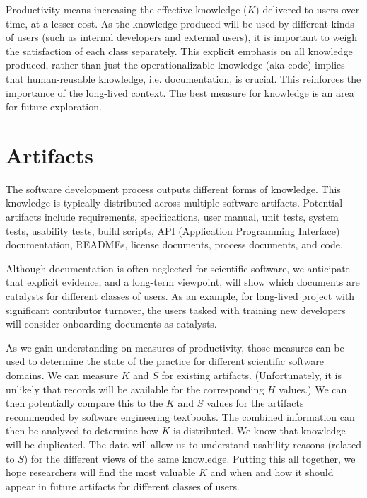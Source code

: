 \documentclass[sigconf, authorversion, nonacm]{acmart}
\begin{document}
Productivity means increasing the effective knowledge ($K$) delivered to users
over time, at a lesser cost. As the knowledge produced will be used by different
kinds of users (such as internal developers and external users), it is important
to weigh the satisfaction of each class separately. This explicit emphasis on
all knowledge produced, rather than just the operationalizable knowledge (aka
code) implies that human-reusable knowledge, i.e. documentation, is crucial.
This reinforces the importance of the long-lived context.  The best measure for
knowledge is an area for future exploration.






\section{Artifacts}

The software development process outputs different forms of knowledge. This
knowledge is typically distributed across multiple software artifacts.
Potential artifacts include requirements, specifications, user manual, unit
tests, system tests, usability tests, build scripts, API (Application
Programming Interface) documentation, READMEs, license documents, process
documents, and code.

Although documentation is often neglected for scientific software, we anticipate
that explicit evidence, and a long-term viewpoint, will show which documents are
catalysts for different classes of users.  As an example, for long-lived project
with significant contributor turnover, the users tasked with training new
developers will consider onboarding documents as catalysts.

As we gain understanding on measures of productivity, those measures can be used
to determine the state of the practice for different scientific software
domains. We can measure $K$ and $S$ for existing artifacts. (Unfortunately, it
is unlikely that records will be available for the corresponding $H$ values.)
We can then potentially compare this to the $K$ and $S$ values for the artifacts
recommended by software engineering textbooks.  The combined information can
then be analyzed to determine how $K$ is distributed.  We know that knowledge
will be duplicated.  The data will allow us to understand usability reasons
(related to $S$) for the different views of the same knowledge.  Putting this
all together, we hope researchers will find the most valuable $K$ and when and
how it should appear in future artifacts for different classes of users.
\end{document}
